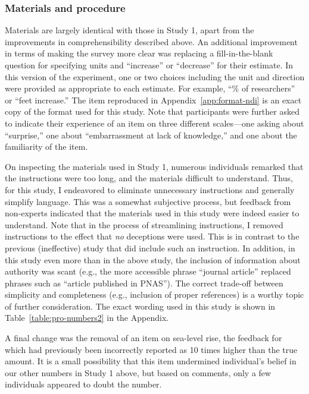 \subsubsection{Materials and procedure}

Materials are largely identical with those in Study 1, apart from the
improvements in comprehensibility described above. An additional improvement in
terms of making the survey more clear was replacing a fill-in-the-blank question
for specifying units and “increase” or “decrease” for their estimate. In this
version of the experiment, one or two choices including the unit and direction
were provided as appropriate to each estimate. For example, “\% of researchers”
or “feet increase.” The item reproduced in Appendix~\ref{app:format-ndi} is an
exact copy of the format used for this study.  Note that participants were
further asked to indicate their experience of an item on three different
scales---one asking about “surprise,” one about “embarrassment at lack of
knowledge,” and one about the familiarity of the item.

On inspecting the materials used in Study 1, numerous individuals remarked that
the instructions were too long, and the materials difficult to understand. Thus,
for this study, I endeavored to eliminate unnecessary instructions and generally
simplify language. This was a somewhat subjective process, but feedback from
non-experts indicated that the materials used in this study were indeed easier
to understand. Note that in the process of streamlining instructions, I removed
instructions to the effect that \emph{no} deceptions were used. This is in
contrast to the previous (ineffective) study that did include such an
instruction.  In addition, in this study even more than in the above study, the
inclusion of information about authority was scant (e.g., the more accessible
phrase “journal article” replaced phrases such as “article published in PNAS”).
The correct trade-off between simplicity and completeness (e.g., inclusion of
proper references) is a worthy topic of further consideration.  The exact
wording used in this study is shown in Table~\ref{table:pro-numbers2} in the
Appendix.

A final change was the removal of an item on sea-level rise, the feedback for
which had previously been incorrectly reported as 10 times higher than the true
amount. It is a small possibility that this item undermined individual's belief
in our other numbers in Study 1 above, but based on comments, only a few
individuals appeared to doubt the number.

